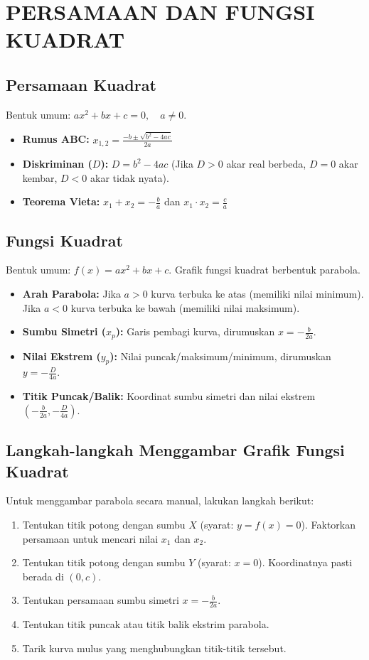 \documentclass[12pt, a4paper]{article}
\begin{document}
\section{PERSAMAAN DAN FUNGSI KUADRAT}

\subsection{Persamaan Kuadrat}
Bentuk umum: $ax^2 + bx + c = 0, \quad a \neq 0$.
\begin{itemize}
    \item \textbf{Rumus ABC:} $x_{1,2} = \frac{-b \pm \sqrt{b^2 - 4ac}}{2a}$
    \item \textbf{Diskriminan ($D$):} $D = b^2 - 4ac$ (Jika $D > 0$ akar real berbeda, $D = 0$ akar kembar, $D < 0$ akar tidak nyata).
    \item \textbf{Teorema Vieta:} $x_1 + x_2 = -\frac{b}{a}$ dan $x_1 \cdot x_2 = \frac{c}{a}$
\end{itemize}

\subsection{Fungsi Kuadrat}
Bentuk umum: $f(x) = ax^2 + bx + c$. Grafik fungsi kuadrat berbentuk parabola.
\begin{itemize}
    \item \textbf{Arah Parabola:} Jika $a > 0$ kurva terbuka ke atas (memiliki nilai minimum). Jika $a < 0$ kurva terbuka ke bawah (memiliki nilai maksimum).
    \item \textbf{Sumbu Simetri ($x_p$):} Garis pembagi kurva, dirumuskan $x = -\frac{b}{2a}$.
    \item \textbf{Nilai Ekstrem ($y_p$):} Nilai puncak/maksimum/minimum, dirumuskan $y = -\frac{D}{4a}$.
    \item \textbf{Titik Puncak/Balik:} Koordinat sumbu simetri dan nilai ekstrem $(-\frac{b}{2a}, -\frac{D}{4a})$.
\end{itemize}

\subsection{Langkah-langkah Menggambar Grafik Fungsi Kuadrat}
Untuk menggambar parabola secara manual, lakukan langkah berikut:
\begin{enumerate}
    \item Tentukan titik potong dengan sumbu $X$ (syarat: $y = f(x) = 0$). Faktorkan persamaan untuk mencari nilai $x_1$ dan $x_2$.
    \item Tentukan titik potong dengan sumbu $Y$ (syarat: $x = 0$). Koordinatnya pasti berada di $(0, c)$.
    \item Tentukan persamaan sumbu simetri $x = -\frac{b}{2a}$.
    \item Tentukan titik puncak atau titik balik ekstrim parabola.
    \item Tarik kurva mulus yang menghubungkan titik-titik tersebut.
\end{enumerate}
\end{document}
